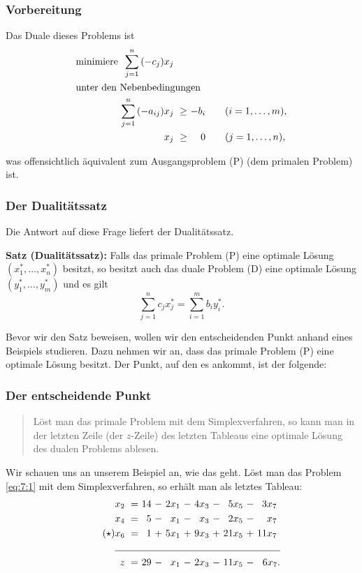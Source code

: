 \documentclass[smaller]{beamer}
\begin{document}
\begin{frame}
\frametitle{Vorbereitung}
Das Duale dieses Problems ist
\begin{align*}
\begin{alignedat}{3}
& \text{minimiere } & \sum\limits_{j=1}^{n}{(-c_j)x_j} & & & \\
& \rlap{unter den Nebenbedingungen} & & & & \\
&& \sum\limits_{j=1}^{n}{(-a_{ij})x_j} &\ \geq &\ -b_i & \qquad (i=1,\ldots,m), \\
&&                                 x_j &\ \geq &\    0 & \qquad (j=1,\ldots,n),
\end{alignedat}
\end{align*}

was offensichtlich äquivalent zum Ausgangsproblem (P) (dem primalen Problem) ist.
\end{frame}

\begin{frame}
\frametitle{Der Dualitätssatz}
 Die Antwort auf diese Frage liefert der \alert{Dualitätssatz}. \\ \vspace*{0.2cm}

\textbf{Satz (Dualitätssatz):}
Falls das primale Problem (P) eine optimale Lösung $(x_1^*, \ldots, x_n^*)$ besitzt, so besitzt auch das duale Problem (D) eine optimale Lösung $(y_1^*, \ldots,y_m^*)$ und es gilt
\begin{equation}
\label{eq:7:5}
\sum\limits_{j=1}^{n}{c_jx_j^*} = \sum\limits_{i=1}^{m}{b_iy_i^*}.
\end{equation}

Bevor wir den Satz beweisen, wollen wir den entscheidenden Punkt anhand eines Beispiels studieren. Dazu nehmen wir an, dass das primale Problem (P) eine optimale Lösung besitzt. Der Punkt, auf den es ankommt, ist der folgende:
\end{frame}

\begin{frame}
\frametitle{Der entscheidende Punkt}
 \begin{quote}
\alert{Löst man das primale Problem mit dem Simplexverfahren, so kann man in der letzten Zeile (der $z$-Zeile) des letzten Tableaus eine optimale Lösung des dualen Problems ablesen.}
\end{quote}

{Wir schauen uns an unserem Beispiel an, wie das geht}. Löst man das Problem \eqref{eq:7:1} mit dem Simplexverfahren, so erhält man als letztes Tableau:
\begin{align}
\label{eq:7:*}
\tag{$\star$}
\begin{alignedat}{6}
x_2 &\ = &\ 14 &\ - &\ 2x_1 &\ - &\ 4x_3 &\ - &\  5x_5 &\ - &\  3x_7\ \\
x_4 &\ = &\  5 &\ - &\  x_1 &\ - &\  x_3 &\ - &\  2x_5 &\ - &\   x_7\ \\
x_6 &\ = &\  1 &\ + &\ 5x_1 &\ + &\ 9x_3 &\ + &\ 21x_5 &\ + &\ 11x_7\ \\ \cline{1-11}
  z &\ = &\ 29 &\ - &\  x_1 &\ - &\ 2x_3 &\ - &\ 11x_5 &\ - &\  6x_7.
\end{alignedat}
\end{align}
\end{frame}
\end{document}
